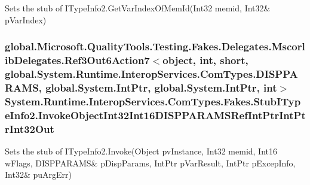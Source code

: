 Sets the stub of I\-Type\-Info2.\-Get\-Var\-Index\-Of\-Mem\-Id(Int32 memid, Int32\& p\-Var\-Index)

\hypertarget{class_system_1_1_runtime_1_1_interop_services_1_1_com_types_1_1_fakes_1_1_stub_i_type_info2_a019ffb3957b09c51f94f74b9a7d5a398}{
\subsubsection[{Invoke\-Object\-Int32\-Int16\-D\-I\-S\-P\-P\-A\-R\-A\-M\-S\-Ref\-Int\-Ptr\-Int\-Ptr\-Int32\-Out}]{\setlength{\rightskip}{0pt plus 5cm}global.\-Microsoft.\-Quality\-Tools.\-Testing.\-Fakes.\-Delegates.\-Mscorlib\-Delegates.\-Ref3\-Out6\-Action7$<$object, int, short, global.\-System.\-Runtime.\-Interop\-Services.\-Com\-Types.\-D\-I\-S\-P\-P\-A\-R\-A\-M\-S, global.\-System.\-Int\-Ptr, global.\-System.\-Int\-Ptr, int$>$ System.\-Runtime.\-Interop\-Services.\-Com\-Types.\-Fakes.\-Stub\-I\-Type\-Info2.\-Invoke\-Object\-Int32\-Int16\-D\-I\-S\-P\-P\-A\-R\-A\-M\-S\-Ref\-Int\-Ptr\-Int\-Ptr\-Int32\-Out}}\label{class_system_1_1_runtime_1_1_interop_services_1_1_com_types_1_1_fakes_1_1_stub_i_type_info2_a019ffb3957b09c51f94f74b9a7d5a398}


Sets the stub of I\-Type\-Info2.\-Invoke(Object pv\-Instance, Int32 memid, Int16 w\-Flags, D\-I\-S\-P\-P\-A\-R\-A\-M\-S\& p\-Disp\-Params, Int\-Ptr p\-Var\-Result, Int\-Ptr p\-Excep\-Info, Int32\& pu\-Arg\-Err)

